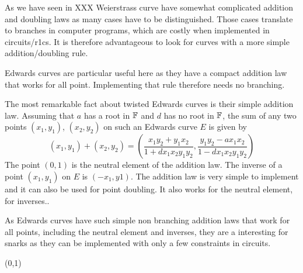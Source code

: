 As we have seen in XXX Weierstrass curve have somewhat complicated addition and doubling laws as many cases have to be distinguished. Those cases translate to branches in computer programs, which are costly when implemented in circuits/r1cs. It is therefore advantageous to look for curves with a more simple addition/doubling rule.

Edwards curves are particular useful here as they have a compact addition law that works for all point. Implementing that rule therefore needs no branching. 

The most remarkable fact about twisted Edwards curves is their simple addition law. Assuming that $a$ has a root in $\mathbb{F}$ and $d$ has no root in $\mathbb{F}$, the sum of any two points $(x_1, y_1)$, $(x_2, y_2)$ on such an Edwards curve $E$ is given by
$$
(x_1, y_1) + (x_2, y_2) =\left(\frac{x_1y_2+y_1x_2}{1 +dx_1x_2y_1y_2},\frac{y_1y_2-ax_1x_2}{1-dx_1x_2y_1y_2}\right)
$$
The point $(0,1)$ is the neutral element of the addition law. The inverse of a point $(x_1, y_1)$ on $E$ is $(-x_1, y1)$. The addition law is very simple to implement and it can also be used for point doubling. It also works for the neutral element, for inverses..

As Edwards curves have such simple non branching addition laws that work for all points, including the neutral element and inverses, they are a interesting for snarks as they can be implemented with only a few constraints in circuits.

(0,1)


